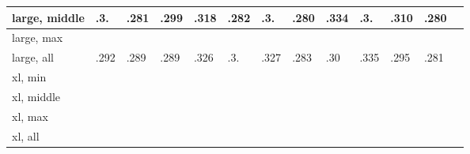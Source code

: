 \documentclass[10pt,letterpaper]{article}
\begin{document}
\begin{table}[!ht]
\begin{tabular}{|l|l|l|l|l|l|l|l|l|l|l|l|l|}
        large, middle & .3. & .281 & .299 & .318 & .282 & .3. & .280 & .334 & .3. & .310 & .280 \\ \hline
        large, max & ~ & ~ & ~ & ~ & ~ & ~ & ~ & ~ & ~ & ~ & ~ \\ \hline
        large, all & .292 & .289 & .289 & .326 & .3. & .327 & .283 & .30 & .335 & .295 & .281 \\ \hline
        xl, min & ~ & ~ & ~ & ~ & ~ & ~ & ~ & ~ & ~ & ~ & ~ \\ \hline
        xl, middle & ~ & ~ & ~ & ~ & ~ & ~ & ~ & ~ & ~ & ~ & ~ \\ \hline
        xl, max & ~ & ~ & ~ & ~ & ~ & ~ & ~ & ~ & ~ & ~ & ~ \\ \hline
        xl, all & ~ & ~ & ~ & ~ & ~ & ~ & ~ & ~ & ~ & ~ & ~ \\ \hline
    \end{tabular}
\end{table}
\end{document}
